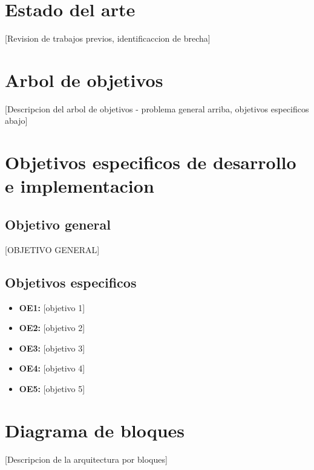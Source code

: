 \documentclass[12pt,a4paper]{article}
\begin{document}
\section{Estado del arte}
\cite{[referencias del estado del arte]}
[Revision de trabajos previos, identificaccion de brecha]

\section{Arbol de objetivos}
[Descripcion del arbol de objetivos - problema general arriba, objetivos especificos abajo]

\section{Objetivos especificos de desarrollo e implementacion}

\subsection{Objetivo general}
[OBJETIVO GENERAL]

\subsection{Objetivos especificos}
\begin{itemize}
    \item \textbf{OE1:} [objetivo 1]
    \item \textbf{OE2:} [objetivo 2]
    \item \textbf{OE3:} [objetivo 3]
    \item \textbf{OE4:} [objetivo 4]
    \item \textbf{OE5:} [objetivo 5]
\end{itemize}

\section{Diagrama de bloques}
[Descripcion de la arquitectura por bloques]
\end{document}
